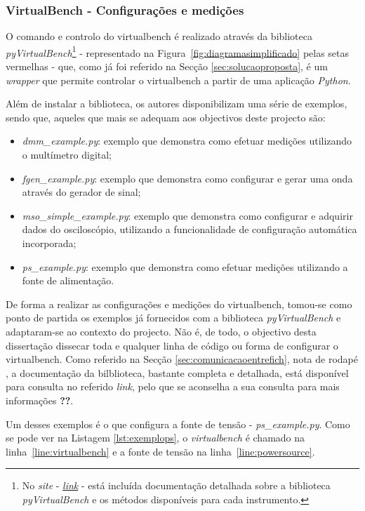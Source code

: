 \subsubsection{VirtualBench - Configurações e medições}
\label{sec:configmedicaoes}
O comando e controlo do \acrshort{virtualbench} é realizado através da biblioteca \textit{pyVirtualBench}\footnote{No \textit{site} - \href{https://pymeasure.readthedocs.io/en/latest/api/instruments/ni/virtualbench.html}{\textit{link}} - está incluída documentação detalhada sobre a biblioteca \textit{pyVirtualBench} e os métodos disponíveis para cada instrumento.\label{fnlabel}} - representado na Figura~\ref{fig:diagramasimplificado} pelas setas vermelhas - que, como já foi referido na Secção \ref{sec:solucaoproposta}, é um \textit{wrapper} que permite controlar o \acrshort{virtualbench} a partir de uma aplicação \textit{Python}.

Além de instalar a biblioteca, os autores disponibilizam uma série de exemplos, sendo que, aqueles que mais se adequam aos objectivos deste projecto são:
\begin{itemize}
	\item \textit{dmm\_example.py}: exemplo que demonstra como efetuar medições utilizando o multímetro digital;
	\item \textit{fgen\_example.py}: exemplo que demonstra como configurar e gerar uma onda através do gerador de sinal;
	\item \textit{mso\_simple\_example.py}: exemplo que demonstra como configurar e adquirir dados do osciloscópio, utilizando a funcionalidade de configuração automática incorporada;
	\item \textit{ps\_example.py}: exemplo que demonstra como efetuar medições utilizando a fonte de alimentação.
\end{itemize}

De forma a realizar as configurações e medições do \acrshort{virtualbench}, tomou-se como ponto de partida os exemplos já fornecidos com a biblioteca \textit{pyVirtualBench} e adaptaram-se ao contexto do projecto. Não é, de todo, o objectivo desta dissertação dissecar toda e qualquer linha de código ou forma de configurar o \acrshort{virtualbench}. Como referido na Secção \ref{sec:comunicacaoentrefich}, nota de rodapé , a documentação da bilblioteca, bastante completa e detalhada, está disponível para consulta no referido \textit{link}, pelo que se aconselha a sua consulta para mais informações \textbf{??}. 

Um desses exemplos é o que configura a fonte de tensão - \textit{ps\_example.py}. Como se pode ver na Listagem \ref{lst:exemplops}, o \textit{virtualbench} é chamado na linha~\ref{line:virtualbench} e a fonte de tensão na linha~\ref{line:powersource}. 

